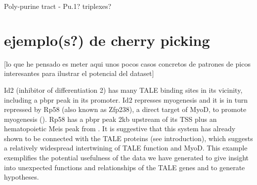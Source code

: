 

Poly-purine tract - Pu.1? triplexes?

\section{ejemplo(s?) de cherry picking}

[lo que he pensado es meter aqui unos pocos casos concretos de patrones de picos interesantes para ilustrar el potencial del dataset]

Id2 (inhibitor of differentiation 2) has many \ac{TALE} binding sites in its vicinity, including a \ac{pbpr} peak in its promoter. Id2 represses myogenesis and it is in turn repressed by Rp58 (also known as Zfp238), a direct target of MyoD, to promote myogenesis (\cite{Yokoyama2009}). Rp58 has a \ac{pbpr} peak 2kb upstream of its TSS plus an hematopoietic Meis peak from \cite{Wilson2010}. It is suggestive that this system has already shown to be connected with the \ac{TALE} proteins (see introduction), which suggests a relatively widespread intertwining of \ac{TALE} function and MyoD. This example exemplifies the potential usefulness of the data we have generated to give insight into unexpected functions and relationships of the \ac{TALE} genes and to generate hypotheses. 


